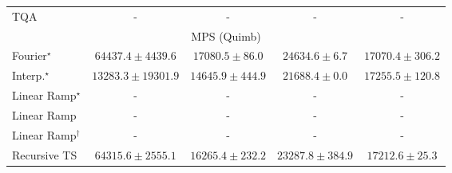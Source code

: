 \begin{tabular}{l|cccc|}
TQA & {\cellcolor[HTML]{000000}} \color[HTML]{F1F1F1} {\cellcolor{white}} \color{black} - & {\cellcolor[HTML]{000000}} \color[HTML]{F1F1F1} {\cellcolor{white}} \color{black} - & {\cellcolor[HTML]{000000}} \color[HTML]{F1F1F1} {\cellcolor{white}} \color{black} - & {\cellcolor[HTML]{000000}} \color[HTML]{F1F1F1} {\cellcolor{white}} \color{black} - \\
\cline{1-5}
\multicolumn{5}{c}{\rule{0pt}{8pt}MPS (Quimb)} \\
\midrule
Fourier$^\star$ & {\cellcolor[HTML]{C44802}} \color[HTML]{F1F1F1} $64437.4\pm 4439.6$ & {\cellcolor[HTML]{FFFBD3}} \color[HTML]{000000} $17080.5\pm 86.0$ & {\cellcolor[HTML]{FFF0AD}} \color[HTML]{000000} $24634.6\pm 6.7$ & {\cellcolor[HTML]{FFFBD3}} \color[HTML]{000000} $17070.4\pm 306.2$ \\
Interp.$^\star$ & {\cellcolor[HTML]{FFFFE5}} \color[HTML]{000000} $13283.3\pm 19301.9$ & {\cellcolor[HTML]{FFFEDF}} \color[HTML]{000000} $14645.9\pm 444.9$ & {\cellcolor[HTML]{FFF7BC}} \color[HTML]{000000} $21688.4\pm 0.0$ & {\cellcolor[HTML]{FFFBD2}} \color[HTML]{000000} $17255.5\pm 120.8$ \\
Linear Ramp$^\star$ & {\cellcolor[HTML]{000000}} \color[HTML]{F1F1F1} {\cellcolor{white}} \color{black} - & {\cellcolor[HTML]{000000}} \color[HTML]{F1F1F1} {\cellcolor{white}} \color{black} - & {\cellcolor[HTML]{000000}} \color[HTML]{F1F1F1} {\cellcolor{white}} \color{black} - & {\cellcolor[HTML]{000000}} \color[HTML]{F1F1F1} {\cellcolor{white}} \color{black} - \\
Linear Ramp & {\cellcolor[HTML]{000000}} \color[HTML]{F1F1F1} {\cellcolor{white}} \color{black} - & {\cellcolor[HTML]{000000}} \color[HTML]{F1F1F1} {\cellcolor{white}} \color{black} - & {\cellcolor[HTML]{000000}} \color[HTML]{F1F1F1} {\cellcolor{white}} \color{black} - & {\cellcolor[HTML]{000000}} \color[HTML]{F1F1F1} {\cellcolor{white}} \color{black} - \\
Linear Ramp$^\dagger$ & {\cellcolor[HTML]{000000}} \color[HTML]{F1F1F1} {\cellcolor{white}} \color{black} - & {\cellcolor[HTML]{000000}} \color[HTML]{F1F1F1} {\cellcolor{white}} \color{black} - & {\cellcolor[HTML]{000000}} \color[HTML]{F1F1F1} {\cellcolor{white}} \color{black} - & {\cellcolor[HTML]{000000}} \color[HTML]{F1F1F1} {\cellcolor{white}} \color{black} - \\
Recursive TS & {\cellcolor[HTML]{C44802}} \color[HTML]{F1F1F1} $64315.6\pm 2555.1$ & {\cellcolor[HTML]{FFFCD7}} \color[HTML]{000000} $16265.4\pm 232.2$ & {\cellcolor[HTML]{FFF3B4}} \color[HTML]{000000} $23287.8\pm 384.9$ & {\cellcolor[HTML]{FFFBD2}} \color[HTML]{000000} $17212.6\pm 25.3$ \\

\end{tabular}
